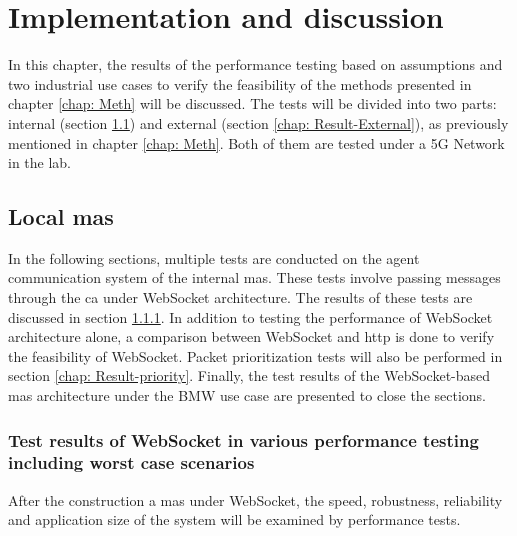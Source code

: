 \chapter{Implementation and discussion} \label{chap: Result}

In this chapter, the results of the performance testing based on assumptions 
and two industrial use cases to verify the feasibility of the methods presented 
in chapter \ref{chap: Meth} will be discussed. The tests will be divided into 
two parts: internal (section \ref{chap: Result-Internal}) and 
external (section \ref{chap: Result-External}), as previously mentioned in 
chapter \ref{chap: Meth}. Both of them are tested under a 5G Network in the lab.



\section{Local \gls{mas}}\label{chap: Result-Internal}
In the following sections, multiple tests are conducted on the agent communication system 
of the internal \gls{mas}. These tests involve passing messages through the \gls{ca} under 
WebSocket architecture. The results of these tests are discussed in 
section \ref{chap: Result-WS}. In addition to testing the performance of WebSocket 
architecture alone, a comparison between WebSocket and \gls{http} is done to verify 
the feasibility of WebSocket. Packet prioritization tests will also be performed in 
section \ref{chap: Result-priority}. Finally, the test results of the 
WebSocket-based \gls{mas} architecture under the BMW use case are presented to 
close the sections.


\subsection{Test results of WebSocket in various performance testing including worst case scenarios} \label{chap: Result-WS}

After the construction a \gls{mas} under WebSocket, the speed, robustness, 
reliability and application size of the system will be examined by 
performance tests. 

